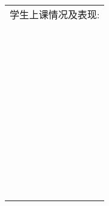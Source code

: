 \documentclass{article}
\begin{document}
\begin{center}
\begin{tabular}{|p{}|p{}|}
            \hline

            \multicolumn{2}{|l|}{学生上课情况及表现:} \\ 
            \multicolumn{2}{|l|}{\,} \\
            \multicolumn{2}{|l|}{\,} \\
            \multicolumn{2}{|l|}{\,} \\
            \multicolumn{2}{|l|}{\,} \\
            \multicolumn{2}{|l|}{\,} \\
            \multicolumn{2}{|l|}{\,} \\
            \multicolumn{2}{|l|}{\,} \\
            \multicolumn{2}{|l|}{\,} \\
            \multicolumn{2}{|l|}{\,} \\
            \multicolumn{2}{|l|}{\,} \\
            
            \hline
        \end{tabular}
    \end{center}
\end{document}
